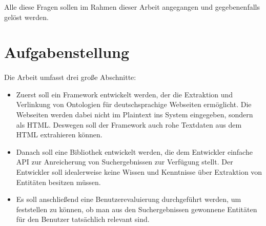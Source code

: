 Alle diese Fragen sollen im Rahmen dieser Arbeit angegangen und gegebenenfalls gelöst werden.

\section{Aufgabenstellung}
\label{sec:Aufgabenstellung}
\paragraph{}
Die Arbeit umfasst drei große Abschnitte: 
\begin{itemize}
\item Zuerst soll ein Framework entwickelt werden, der die Extraktion und Verlinkung von Ontologien für deutschsprachige Webseiten ermöglicht. Die Webseiten werden dabei nicht im Plaintext ins System eingegeben, sondern als HTML. Deswegen soll der Framework auch rohe Textdaten aus dem HTML extrahieren können. 

\item Danach soll eine Bibliothek entwickelt werden, die dem Entwickler einfache API zur Anreicherung von Suchergebnissen zur Verfügung stellt. Der Entwickler soll idealerweise keine Wissen und Kenntnisse über Extraktion von Entitäten besitzen müssen.

\item Es soll anschließend eine Benutzerevaluierung durchgeführt werden, um feststellen zu können, ob man aus den Suchergebnissen gewonnene Entitäten für den Benutzer tatsächlich relevant sind.
\end{itemize}